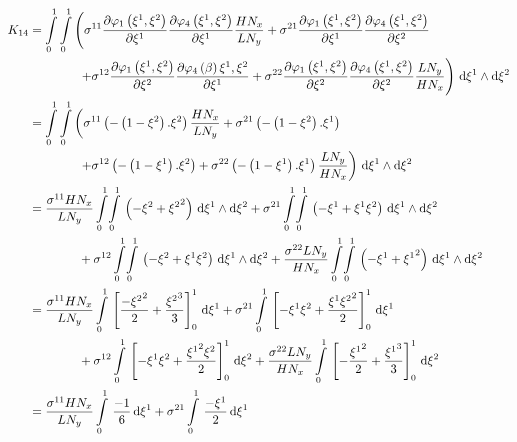 \begin{equation}
  \begin{aligned}
    K_{14}&=\dintl{0}{1}\dintl{0}{1}\left(
    \conductivitytensorsymbol^{11}\delby{\lbfn{1}{\xione,\xitwo}}{\xione}
    \delby{\lbfn{4}{\xione,\xitwo}}{\xione}\dfrac{H N_{x}}{L N_{y}}+
    \conductivitytensorsymbol^{21}\delby{\lbfn{1}{\xione,\xitwo}}{\xione}
    \delby{\lbfn{4}{\xione,\xitwo}}{\xitwo}\right.\\
    &\qquad\qquad\left.+\conductivitytensorsymbol^{12}\delby{\lbfn{1}{\xione,\xitwo}}{\xitwo}
    \delby{\lbfn{4}{\beta}{\xione,\xitwo}}{\xione}+
    \conductivitytensorsymbol^{22}\delby{\lbfn{1}{\xione,\xitwo}}{\xitwo}
    \delby{\lbfn{4}{\xione,\xitwo}}{\xitwo}\dfrac{L N_{y}}{H N_{x}}\right)\infinitesimaltwo{\xione}{\xitwo}\\
    &=\dintl{0}{1}\dintl{0}{1}\left(
    \conductivitytensorsymbol^{11}\pbrac{-\pbrac{1-\xitwo}.\xitwo}\dfrac{H N_{x}}{L N_{y}}+
    \conductivitytensorsymbol^{21}\pbrac{-\pbrac{1-\xitwo}.\xione}\right.\\
    &\qquad\qquad\left.+\conductivitytensorsymbol^{12}\pbrac{-\pbrac{1-\xione}.\xitwo}+
    \conductivitytensorsymbol^{22}\pbrac{-\pbrac{1-\xione}.\xione}\dfrac{L N_{y}}{H N_{x}}\right)
    \infinitesimaltwo{\xione}{\xitwo}\\
    &=\dfrac{\conductivitytensorsymbol^{11} H N_{x}}{L N_{y}}\giint{0}{1}{0}{1}{\pbrac{-\xitwo+\xitwosq}}{\xione}{\xitwo}
    +\conductivitytensorsymbol^{21}\giint{0}{1}{0}{1}{\pbrac{-\xione+\xione\xitwo}}{\xione}{\xitwo}\\
    &\qquad\qquad+\conductivitytensorsymbol^{12}\giint{0}{1}{0}{1}{\pbrac{-\xitwo+\xione\xitwo}}{\xione}{\xitwo}
    +\dfrac{\conductivitytensorsymbol^{22} L N_{y}}{H N_{x}}\giint{0}{1}{0}{1}{\pbrac{-\xione+\xionesq}}{\xione}{\xitwo} \\
    &=\dfrac{\conductivitytensorsymbol^{11} H N_{x}}{L N_{y}}\gint{0}{1}{\sqbrac{\dfrac{-\xitwosq}{2}+\dfrac{\xitwocube}{3}}^{1}_{0}}{\xione}
    +\conductivitytensorsymbol^{21}\gint{0}{1}{\sqbrac{-\xione\xitwo+\dfrac{\xione\xitwosq}{2}}^{1}_{0}}{\xione}\\
    &\qquad\qquad+\conductivitytensorsymbol^{12}\gint{0}{1}{\sqbrac{-\xione\xitwo+\dfrac{\xionesq\xitwo}{2}}^{1}_{0}}{\xitwo}
    +\dfrac{\conductivitytensorsymbol^{22} L N_{y}}{H N_{x}}\gint{0}{1}{\sqbrac{-\dfrac{\xionesq}{2}+\dfrac{\xionecube}{3}}^{1}_{0}}{\xitwo} \\
    &=\dfrac{\conductivitytensorsymbol^{11} H N_{x}}{L N_{y}}\gint{0}{1}{\dfrac{-1}{6}}{\xione}
    +\conductivitytensorsymbol^{21}\gint{0}{1}{\dfrac{-\xione}{2}}{\xione}

\end{aligned}
\end{equation}
